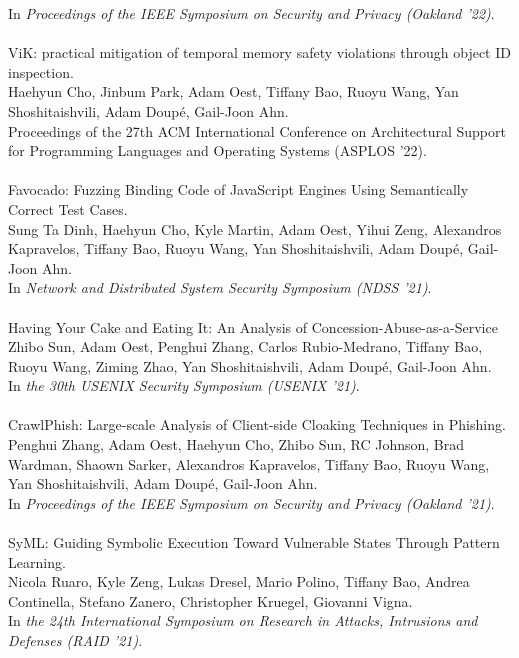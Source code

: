 \documentclass[11pt]{article}
\begin{document}
In \emph{Proceedings of the IEEE Symposium on Security and Privacy (Oakland '22)}.
\\\\
ViK: practical mitigation of temporal memory safety violations through object ID inspection. \\
Haehyun Cho, Jinbum Park, Adam Oest, Tiffany Bao, Ruoyu Wang, Yan Shoshitaishvili, Adam Doupé, Gail-Joon Ahn. \\
Proceedings of the 27th ACM International Conference on Architectural Support for Programming Languages and Operating Systems (ASPLOS '22).
\\\\
Favocado: Fuzzing Binding Code of JavaScript Engines Using Semantically Correct Test Cases. \\
Sung Ta Dinh, Haehyun Cho, Kyle Martin, Adam Oest, Yihui Zeng, Alexandros Kapravelos, Tiffany Bao, Ruoyu Wang, Yan Shoshitaishvili, Adam Doupé, Gail-Joon Ahn. \\
In \emph{Network and Distributed System Security Symposium (NDSS '21)}.
\\\\
Having Your Cake and Eating It: An Analysis of Concession-Abuse-as-a-Service \\
Zhibo Sun, Adam Oest, Penghui Zhang, Carlos Rubio-Medrano, Tiffany Bao, Ruoyu Wang, Ziming Zhao, Yan Shoshitaishvili, Adam Doupé, Gail-Joon Ahn. \\
In \emph{the 30th USENIX Security Symposium (USENIX '21)}.
\\\\
CrawlPhish: Large-scale Analysis of Client-side Cloaking Techniques in Phishing. \\
Penghui Zhang, Adam Oest, Haehyun Cho, Zhibo Sun, RC Johnson, Brad Wardman, Shaown Sarker, Alexandros Kapravelos, 
Tiffany Bao, Ruoyu Wang, Yan Shoshitaishvili, Adam Doupé, Gail-Joon Ahn. \\
In \emph{Proceedings of the IEEE Symposium on Security and Privacy (Oakland '21)}.
\\\\
SyML: Guiding Symbolic Execution Toward Vulnerable States Through Pattern Learning. \\
Nicola Ruaro, Kyle Zeng, Lukas Dresel, Mario Polino, Tiffany Bao, Andrea Continella, Stefano Zanero, Christopher Kruegel, Giovanni Vigna. \\
In \emph{the 24th International Symposium on Research in Attacks, Intrusions and Defenses (RAID '21)}.
\\\\
\end{document}
